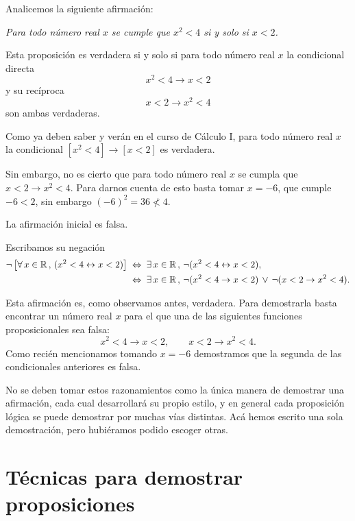 \begin{ejemplo}
Analicemos la siguiente afirmaci\'on: \\

\centerline{\em Para todo n\'umero real
	$x$ se cumple que $x^2<4$ si y solo si $x<2$.}

Esta proposici\'on es verdadera
si y solo si para todo n\'umero real $x$ la condicional directa
$$x^2 < 4 \rightarrow x < 2$$
y su rec\'iproca
$$x < 2 \rightarrow x^2 < 4$$
son ambas verdaderas.

Como ya deben saber y verán en el curso de Cálculo I,
para todo n\'umero real $x$ la condicional
$\left[x^2 < 4\right] \rightarrow \left[x < 2\right]$
es verdadera. 

Sin embargo, no es cierto que para todo
n\'umero real $x$ se cumpla que $x<2 \rightarrow x^2<4$.
Para darnos cuenta de esto 
basta tomar $x=-6$, que cumple $-6<2$, sin embargo $(-6)^2=36\not < 4$. 

La afirmaci\'on inicial es falsa.

Escribamos su negaci\'on
\begin{align*}
\neg\left[\forall\,x\in \mathbb{R}\, ,\,(x^2 < 4 \leftrightarrow x < 2)\right]
	&\;\Leftrightarrow\;
	\exists\,x\in \mathbb{R}\, ,\,
\neg(x^2 < 4 \leftrightarrow x < 2),\\
	&\;\Leftrightarrow\;
	\exists\,x\in \mathbb{R}\, ,\,
\neg(x^2 < 4 \rightarrow x < 2)\,\vee\,
\neg(x< 2 \rightarrow x^2 < 4).
\end{align*}

Esta afirmaci\'on es, como observamos antes, verdadera. Para demostrarla
basta encontrar un n\'umero real $x$ para el que una de las siguientes
funciones proposicionales sea falsa:
\[
	x^2 < 4 \rightarrow x < 2,\qquad x < 2 \rightarrow x^2 < 4.
\]
Como reci\'en mencionamos tomando $x=-6$ demostramos que la segunda
de las condicionales anteriores es falsa.
\end{ejemplo}

No se deben tomar estos razonamientos como la única manera de demostrar una afirmación, cada cual desarrollará su propio estilo, y en general cada proposición lógica se puede demostrar por muchas vías distintas. 
Acá hemos escrito una sola demostración, pero hubiéramos podido escoger otras.



\section{T\'ecnicas para demostrar proposiciones} 

